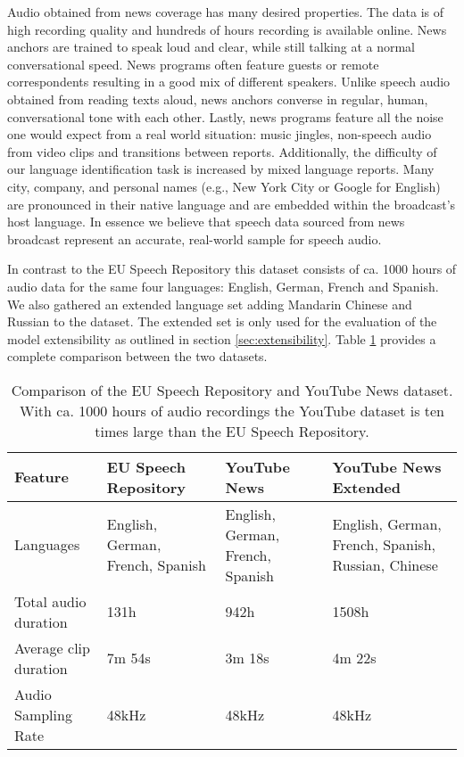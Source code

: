   	
  	Audio obtained from news coverage has many desired properties. The data is of high recording quality and hundreds of hours recording is available online. News anchors are trained to speak loud and clear, while still talking at a normal conversational speed. News programs often feature guests or remote correspondents resulting in a good mix of different speakers. Unlike speech audio obtained from reading texts aloud, news anchors converse in regular, human, conversational tone with each other. Lastly, news programs feature all the noise one would expect from a real world situation: music jingles, non-speech audio from video clips and transitions between reports. Additionally, the difficulty of our language identification task is increased by mixed language reports. Many city, company, and personal names (e.g., New York City or Google for English) are pronounced in their native language and are embedded within the broadcast's host language. In essence we believe that speech data sourced from news broadcast represent an accurate, real-world sample for speech audio.
  	
  	In contrast to the EU Speech Repository this dataset consists of ca. 1000 hours of audio data for the same four languages: English, German, French and Spanish. We also gathered an extended language set adding Mandarin Chinese and Russian to the dataset. The extended set is only used for the evaluation of the model extensibility as outlined in section \ref{sec:extensibility}. Table \ref{tab:dataset_comparison} provides a complete comparison between the two datasets.
  	
  	
\begin{table}[]
\centering
\begin{tabularx}{\textwidth}{lXXX}
\toprule
Feature               & EU Speech Repository & YouTube News & YouTube News \mbox{Extended} \\ 
\midrule
Languages             & English, German, French, Spanish & English, German, French, Spanish & English, German, French, Spanish, Russian, Chinese \\
Total audio duration  & 131h   & 942h   & 1508h   \\
Average clip duration & 7m 54s & 3m 18s & 4m 22s  \\
Audio Sampling Rate   & 48kHz  & 48kHz  & 48kHz   \\ 
\bottomrule
\end{tabularx}
\caption{Comparison of the EU Speech Repository and YouTube News dataset. With ca. 1000 hours of audio recordings the YouTube dataset is ten times large than the EU Speech Repository.}
\label{tab:dataset_comparison}
\end{table}

	


